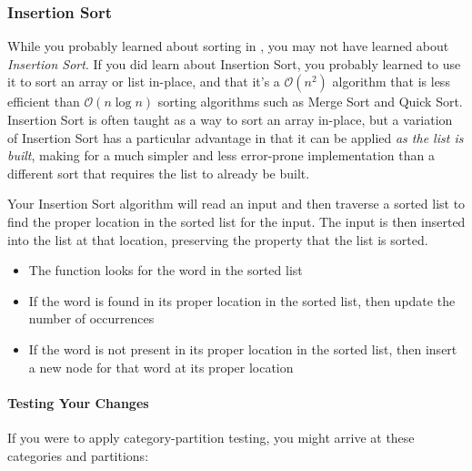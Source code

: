 \subsubsection{Insertion Sort}

While you probably learned about sorting in \cstwo, you may not have learned about \textit{Insertion Sort}.
If you did learn about Insertion Sort, you probably learned to use it to sort an array or list in-place, and that it's a $\mathcal{O}(n^2)$ algorithm that is less efficient than $\mathcal{O}(n \log n)$ sorting algorithms such as Merge Sort and Quick Sort.
Insertion Sort is often taught as a way to sort an array in-place,
but a variation of Insertion Sort has a particular advantage in that it can be applied \textit{as the list is built}, making for a much simpler and less error-prone implementation than a different sort that requires the list to already be built.

Your Insertion Sort algorithm will read an input and then traverse a sorted list to find the proper location in the sorted list for the input.
The input is then inserted into the list at that location, preserving the property that the list is sorted.

\begin{description}
        \begin{itemize}
            \item The function looks for the word in the sorted list
            \item If the word is found in its proper location in the sorted list, then update the number of occurrences
            \item If the word is not present in its proper location in the sorted list, then insert a new node for that word at its proper location
        \end{itemize}
\end{description}

\paragraph{Testing Your Changes}

If you were to apply category-partition testing, you might arrive at these categories and partitions:

